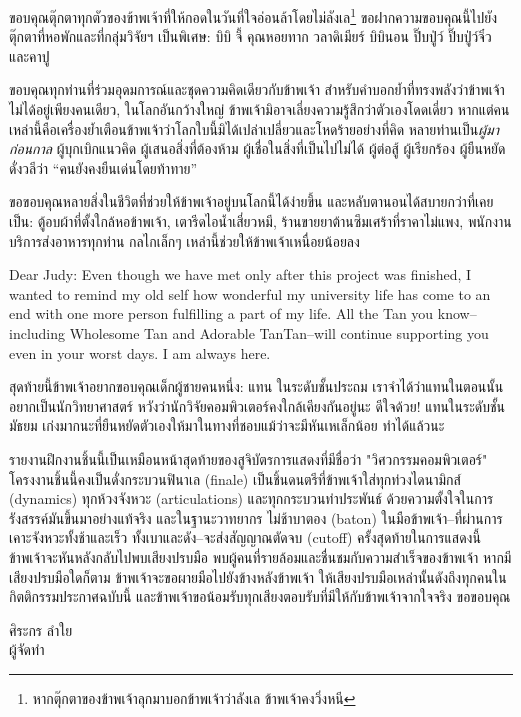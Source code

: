 ขอบคุณตุ๊กตาทุกตัวของข้าพเจ้าที่ให้กอดในวันที่ใจอ่อนล้าโดยไม่ลังเล\footnote{หากตุ๊กตาของข้าพเจ้าลุกมาบอกข้าพเจ้าว่าลังเล ข้าพเจ้าคงวิ่งหนี} ขอฝากความขอบคุณนี้ไปยังตุ๊กตาที่หอพักและที่กลุ่มวิจัยฯ เป็นพิเศษ: บิบิ จี้ คุณหอยทาก วลาดิเมียร์ บิบินอน ปิ๊บปู่ว์ ปิ๊บปู่ว์จิ๋ว และคาปู

ขอบคุณทุกท่านที่ร่วมอุดมการณ์และชุดความคิดเดียวกับข้าพเจ้า สำหรับคำบอกย้ำที่ทรงพลังว่าข้าพเจ้าไม่ได้อยู่เพียงคนเดียว, ในโลกอันกว้างใหญ่ ข้าพเจ้ามิอาจเลี่ยงความรู้สึกว่าตัวเองโดดเดี่ยว หากแต่คนเหล่านี้คือเครื่องย้ำเตือนข้าพเจ้าว่าโลกใบนี้มิได้เปล่าเปลี่ยวและโหดร้ายอย่างที่คิด หลายท่านเป็น\textit{ผู้มาก่อนกาล} ผู้บุกเบิกแนวคิด ผู้เสนอสิ่งที่ต้องห้าม ผู้เชื่อในสิ่งที่เป็นไปไม่ได้ ผู้ต่อสู้ ผู้เรียกร้อง ผู้ยืนหยัด ดั่งวลีว่า ``คนยังคงยืนเด่นโดยท้าทาย''

ขอขอบคุณหลายสิ่งในชีวิตที่ช่วยให้ข้าพเจ้าอยู่บนโลกนี้ได้ง่ายขึ้น และหลับตานอนได้สบายกว่าที่เคยเป็น: ตู้อบผ้าที่ตั้งใกล้หอข้าพเจ้า, เตารีดไอน้ำเสี่ยวหมี, ร้านขายยาต้านซึมเศร้าที่ราคาไม่แพง, พนักงานบริการส่งอาหารทุกท่าน กลไกเล็กๆ เหล่านี้ช่วยให้ข้าพเจ้าเหนื่อยน้อยลง

Dear Judy: Even though we have met only after this project was finished, I wanted to remind my old self how wonderful my university life has come to an end with one more person fulfilling a part of my life. All the Tan you know--including Wholesome Tan and Adorable TanTan--will continue supporting you even in your worst days. I am always here.

สุดท้ายนี้ข้าพเจ้าอยากขอบคุณเด็กผู้ชายคนหนึ่ง: แทน ในระดับชั้นประถม  เราจำได้ว่าแทนในตอนนั้นอยากเป็นนักวิทยาศาสตร์ หวังว่านักวิจัยคอมพิวเตอร์คงใกล้เคียงกันอยู่นะ ดีใจด้วย! แทนในระดับชั้นมัธยม เก่งมากนะที่ยืนหยัดตัวเองให้มาในทางที่ชอบแม้ว่าจะมีหันเหเล็กน้อย ทำได้แล้วนะ

รายงานฝึกงานชิ้นนี้เป็นเหมือนหน้าสุดท้ายของสูจิบัตรการแสดงที่มีชื่อว่า "วิศวกรรมคอมพิวเตอร์" โครงงานชิ้นนี้คงเป็นดั่งกระบวนฟินาเล (finale) เป็นชิ้นดนตรีที่ข้าพเจ้าใส่ทุกท่วงไดนามิกส์ (dynamics) ทุกห้วงจังหวะ (articulations) และทุกกระบวนท่าประพันธ์ ด้วยความตั้งใจในการรังสรรค์มันขึ้นมาอย่างแท้จริง และในฐานะวาทยากร ไม่ช้าบาตอง (baton) ในมือข้าพเจ้า--ที่ผ่านการเคาะจังหวะทั้งช้าและเร็ว ทั้งเบาและดัง--จะส่งสัญญาณตัดจบ (cutoff) ครั้งสุดท้ายในการแสดงนี้ ข้าพเจ้าจะหันหลังกลับไปพบเสียงปรบมือ พบผู้คนที่รายล้อมและชื่นชมกับความสำเร็จของข้าพเจ้า หากมีเสียงปรบมือใดก็ตาม ข้าพเจ้าจะขอผายมือไปยังข้างหลังข้าพเจ้า ให้เสียงปรบมือเหล่านั้นดังถึงทุกคนในกิตติกรรมประกาศฉบับนี้ และข้าพเจ้าขอน้อมรับทุกเสียงตอบรับที่มีให้กับข้าพเจ้าจากใจจริง ขอขอบคุณ

\vskip 20pt

\hfill\begin{minipage}
    {\dimexpr 5cm}
    \begin{center}
        ศิระกร ลำใย\\
        ผู้จัดทำ
    \end{center}
    \xdef\tpd{\the\prevdepth}
\end{minipage}
